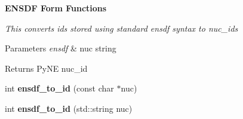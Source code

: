 \begin{Indent}{\bf E\+N\+S\+DF Form Functions}\par
{\em This converts id\textquotesingle{}s stored using standard ensdf syntax to nuc\+\_\+id\textquotesingle{}s 
\begin{DoxyParams}{Parameters}
{\em ensdf} & nuc string \\
\hline
\end{DoxyParams}
\begin{DoxyReturn}{Returns}
Py\+NE nuc\+\_\+id 
\end{DoxyReturn}
}\begin{DoxyCompactItemize}
\item 
int {\bfseries ensdf\+\_\+to\+\_\+id} (const char $\ast$nuc)\hypertarget{namespacepyne_1_1nucname_addaba3a33cfa89a82f66c65f86975fdb}{}\label{namespacepyne_1_1nucname_addaba3a33cfa89a82f66c65f86975fdb}

\item 
int {\bfseries ensdf\+\_\+to\+\_\+id} (std\+::string nuc)\hypertarget{namespacepyne_1_1nucname_adb8e773bd38f51c6eb27af49b6285471}{}\label{namespacepyne_1_1nucname_adb8e773bd38f51c6eb27af49b6285471}

\end{DoxyCompactItemize}
\end{Indent}
